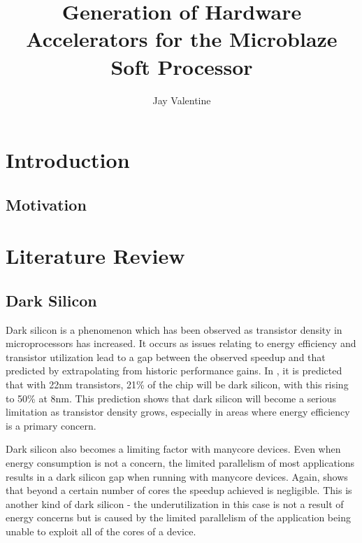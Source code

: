 \documentclass{UoYCSproject}
\begin{document}
\title{Generation of Hardware Accelerators for the Microblaze Soft Processor}
\author{Jay Valentine}

\maketitle

\begin{abstract}
\end{abstract}

\chapter*{Introduction}

\section{Motivation}

\chapter*{Literature Review}

\section{Dark Silicon}

Dark silicon is a phenomenon which has been observed as transistor density in microprocessors has increased.
It occurs as issues relating to energy efficiency and transistor utilization lead to a gap between the
observed speedup and that predicted by extrapolating from historic performance gains.
In \cite{darksilicon}, it is predicted that with 22nm transistors, 21\% of the chip will be dark silicon,
with this rising to 50\% at 8nm. This prediction shows that dark silicon will become a serious limitation
as transistor density grows, especially in areas where energy efficiency is a primary concern.

Dark silicon also becomes a limiting factor with manycore devices. Even when energy consumption is not a
concern, the limited parallelism of most applications results in a dark silicon gap when running with
manycore devices. Again, \cite{darksilicon} shows that beyond a certain number of cores the speedup achieved
is negligible. This is another kind of dark silicon - the underutilization in this case is not a result of
energy concerns but is caused by the limited parallelism of the application being unable to exploit all of
the cores of a device.
\end{document}
